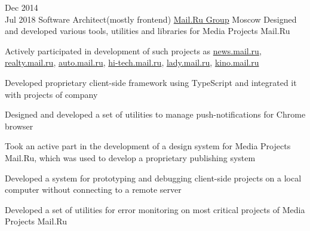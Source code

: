 \documentclass[11pt,a4paper,sans]{moderncv}
\newcommand{\lang}[2]{#2}
\begin{document}
	\cventry
		{\lang{Дек}{Dec} 2014\\\lang{Июл}{Jul} 2018}
		{\lang
			{Архитектор программного обеспечения}
			{Software Architect(mostly frontend)}}
		{\href{https://corp.mail.ru}{Mail.Ru Group}}
		{\lang
			{Москва}
			{Moscow}}
		{}
		{\lang
			{Занимался проектированием и разработкой инструментов, утилит и библиотек в медиапроектах Mail.Ru.}
			{Designed and developed various tools, utilities and libraries for Media Projects Mail.Ru}}

		\cvlistitem
		{\lang
			{Принимал участие в разработке проектов \href{https://news.mail.ru}{news.mail.ru}, \href{https://realty.mail.ru}{realty.mail.ru}, \href{https://auto.mail.ru}{auto.mail.ru}, \href{https://hi-tech.mail.ru}{hi-tech.mail.ru}, \href{https://lady.mail.ru}{lady.mail.ru}, \href{https://kino.mail.ru}{kino.mail.ru}}
			{Actively participated in development of such projects as \href{https://news.mail.ru}{news.mail.ru}, \href{https://realty.mail.ru}{realty.mail.ru}, \href{https://auto.mail.ru}{auto.mail.ru}, \href{https://hi-tech.mail.ru}{hi-tech.mail.ru}, \href{https://lady.mail.ru}{lady.mail.ru}, \href{https://kino.mail.ru}{kino.mail.ru}}}

		\cvlistitem
		{\lang
			{Разработал фреймворк для создания клиентских приложений с использованием языка TypeScript}
			{Developed proprietary client-side framework using TypeScript and integrated it with projects of company}}

		\cvlistitem
		{\lang
			{Разработал и внедрил набор утилит для управления push-уведомлениями для браузера Chrome}
			{Designed and developed a set of utilities to manage push-notifications for Chrome browser}}

		\cvlistitem
		{\lang
			{Принимал участие в разработке дизайн-системы для медийных проектов mail.ru, на основе которой была создана система для разработки новых проектов компании}
			{Took an active part in the development of a design system for Media Projects Mail.Ru, which was used to develop a proprietary publishing system}}

		\cvlistitem
		{\lang
			{Разработал систему прототипирования и отладки клиентской части проектов на локальном компьютере без подключения к удаленному серверу}
			{Developed a system for prototyping and debugging client-side projects on a local computer without connecting to a remote server}}

		\cvlistitem
		{\lang
			{Разработал и внедрил систему мониторинга критических ошибок на высоконагруженных проектах компании}
			{Developed a set of utilities for error monitoring on most critical projects of Media Projects Mail.Ru}\\}
\end{document}
